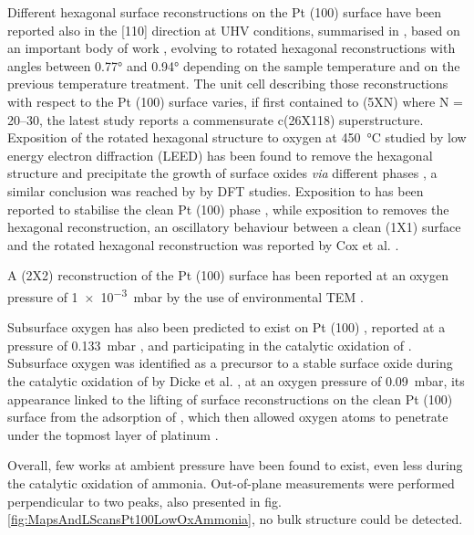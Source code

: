 Different hexagonal surface reconstructions on the Pt (100) surface have been reported also in the [110] direction at UHV conditions, summarised in \cite{Hammer2016}, based on an important body of work \parencite{Heilmann1979, Vanhove1981, Heinz1982, Mase1992, Kuhnke1992, Borg1994, VanBeurden2004, Havu2010}, evolving to rotated hexagonal reconstructions with angles between \ang{0.77} and \ang{0.94} depending on the sample temperature and on the previous temperature treatment.
The unit cell describing those reconstructions with respect to the Pt (100) surface varies, if first contained to (5XN) where N = 20–30, the latest study reports a commensurate c(26X118) superstructure.
Exposition of the rotated hexagonal structure to oxygen at \qty{450}{\degreeCelsius} studied by low energy electron diffraction (LEED) has been found to remove the hexagonal structure and precipitate the growth of surface oxides \textit{via} different phases \parencite{BradleyShumbera2007, BradleyShumbera2007a}, a similar conclusion was reached by \cite{Deskins2005} by DFT studies.
Exposition to  has been reported to stabilise the clean Pt (100) phase \parencite{Heinz1982}, while exposition to  removes the hexagonal reconstruction, an oscillatory behaviour between a clean (1X1) surface and the rotated hexagonal reconstruction was reported by Cox et al. \parencite*{Cox1983}.

A (2X2) reconstruction of the Pt (100) surface has been reported at an oxygen pressure of \qty{1e-3}{mbar} by the use of environmental TEM \parencite{Li2016}.

Subsurface oxygen has also been predicted to exist on Pt (100) \parencite{Gu2007}, reported at a pressure of \qty{0.133}{\milli\bar} \parencite{McMillan2005}, and participating in the catalytic oxidation of .
Subsurface oxygen was identified as a precursor to a stable surface oxide during the catalytic oxidation of  by Dicke et al. \parencite*{Dicke2000}, at an oxygen pressure of \qty{0.09}{\milli\bar}, its appearance linked to the lifting of surface reconstructions on the clean Pt (100) surface from the adsorption of , which then allowed oxygen atoms to penetrate under the topmost layer of platinum \parencite{Rotermund1993, Lauterbach1994}.

Overall, few works at ambient pressure have been found to exist, even less during the catalytic oxidation of ammonia.
Out-of-plane measurements were performed perpendicular to two peaks, also presented in fig. \ref{fig:MapsAndLScansPt100LowOxAmmonia}, no bulk structure could be detected.

